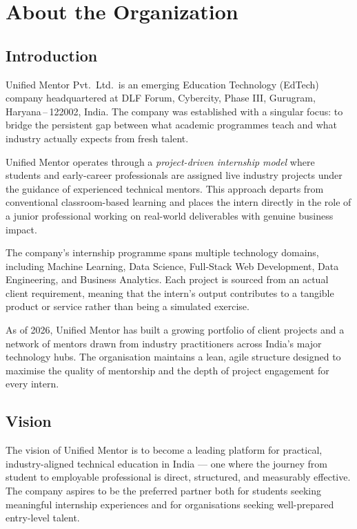 \documentclass[12pt, a4paper]{report}
\begin{document}
\chapter{About the Organization}

\section{Introduction}

Unified Mentor Pvt.\ Ltd.\ is an emerging Education Technology (EdTech) company
headquartered at DLF Forum, Cybercity, Phase III, Gurugram, Haryana\,--\,122002,
India. The company was established with a singular focus: to bridge the persistent
gap between what academic programmes teach and what industry actually expects from
fresh talent.

Unified Mentor operates through a \emph{project-driven internship model} where
students and early-career professionals are assigned live industry projects under
the guidance of experienced technical mentors. This approach departs from
conventional classroom-based learning and places the intern directly in the
role of a junior professional working on real-world deliverables with genuine
business impact.

The company's internship programme spans multiple technology domains, including
Machine Learning, Data Science, Full-Stack Web Development, Data Engineering, and
Business Analytics. Each project is sourced from an actual client requirement,
meaning that the intern's output contributes to a tangible product or service
rather than being a simulated exercise.

As of 2026, Unified Mentor has built a growing portfolio of client projects and
a network of mentors drawn from industry practitioners across India's major
technology hubs. The organisation maintains a lean, agile structure designed to
maximise the quality of mentorship and the depth of project engagement for every
intern.

\section{Vision}

The vision of Unified Mentor is to become a leading platform for practical,
industry-aligned technical education in India — one where the journey from
student to employable professional is direct, structured, and measurably
effective. The company aspires to be the preferred partner both for students
seeking meaningful internship experiences and for organisations seeking
well-prepared entry-level talent.
\end{document}
